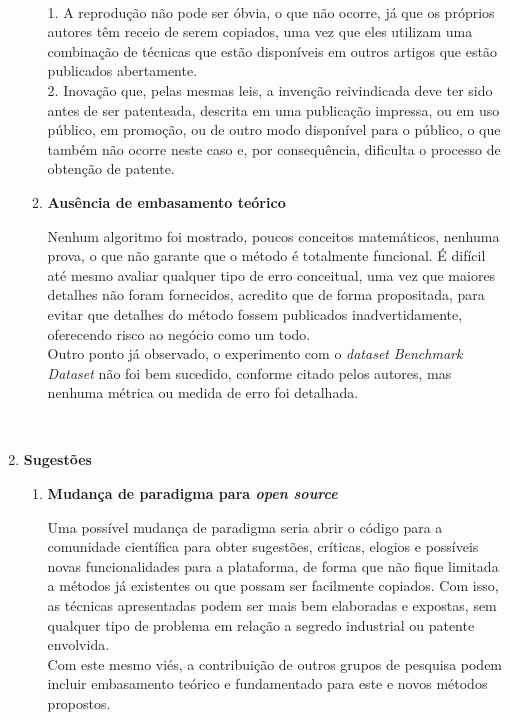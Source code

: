 \begin{enumerate}
\begin{enumerate}[label*=\arabic*.]
\\[6pt]
1. A reprodução não pode ser óbvia, o que não ocorre, já que os próprios autores têm receio de serem copiados, uma vez que eles utilizam uma combinação de técnicas que estão disponíveis em outros artigos que estão publicados abertamente.
\\[6pt]
2. Inovação que, pelas mesmas leis, a invenção reivindicada deve ter sido antes de ser patenteada, descrita em uma publicação impressa, ou em uso público, em promoção, ou de outro modo disponível para o público, o que também não ocorre neste caso e, por consequência, dificulta o processo de obtenção de patente.
\\[6pt]
\item \textbf{Ausência de embasamento teórico}

Nenhum algoritmo foi mostrado, poucos conceitos matemáticos, nenhuma prova, o que não garante que o método é totalmente funcional. É difícil até mesmo avaliar qualquer tipo de erro conceitual, uma vez que maiores detalhes não foram fornecidos, acredito que de forma propositada, para evitar que detalhes do método fossem publicados inadvertidamente, oferecendo risco ao negócio como um todo.
\\[6pt]
Outro ponto já observado, o experimento com o \textit{dataset} \textit{Benchmark Dataset} não foi bem sucedido, conforme citado pelos autores, mas nenhuma métrica ou medida de erro foi detalhada.
\end{enumerate}
\\[6pt]
  \item \textbf{Sugestões}
    \begin{enumerate}[label*=\arabic*.]
\item \textbf{Mudança de paradigma para \textit{open source}}

Uma possível mudança de paradigma seria abrir o código para a comunidade científica para obter sugestões, críticas, elogios e possíveis novas funcionalidades para a plataforma, de forma que não fique limitada a métodos já existentes ou que possam ser facilmente copiados. Com isso, as técnicas apresentadas podem ser mais bem elaboradas e expostas, sem qualquer tipo de problema em relação a segredo industrial ou patente envolvida.
\\[6pt]
Com este mesmo viés, a contribuição de outros grupos de pesquisa podem incluir embasamento teórico e fundamentado para este e novos métodos propostos.
    \end{enumerate}
\end{enumerate}
